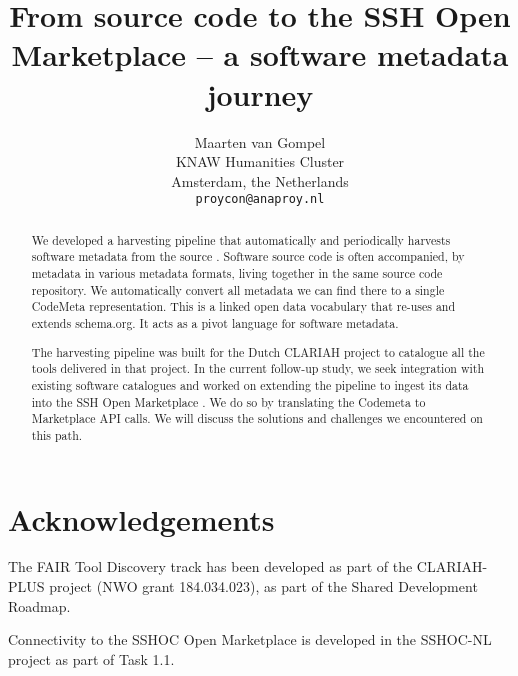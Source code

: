 \documentclass[a4paper,11pt]{article}
\title{From source code to the SSH Open Marketplace -- a software metadata journey}
\author{Maarten van Gompel \\
  KNAW Humanities Cluster \\
  Amsterdam, the Netherlands \\
  {\tt proycon@anaproy.nl} %
}
\date{}
\begin{document}
\maketitle
\begin{abstract}
We developed a harvesting pipeline that automatically and periodically harvests
software metadata from the source \citep{CLARINCONF2024}. Software source code is often accompanied,
by metadata in various metadata formats, living together in the same source
code repository. We automatically convert all metadata we can find there to a
single CodeMeta representation. This is a linked open data vocabulary that
re-uses and extends schema.org. It acts as a pivot language for software
metadata. 

The harvesting pipeline was built for the Dutch CLARIAH project to catalogue all
the tools delivered in that project. In the current follow-up study, we seek
integration with existing software catalogues and worked on extending the
pipeline to ingest its data into the SSH Open Marketplace \citep{MPSPEC,MPINTEROP,MPDATAPOP}. We do so by
translating the Codemeta to Marketplace API calls. We will discuss the
solutions and challenges we encountered on this path. 
\end{abstract}


\section*{Acknowledgements}

The FAIR Tool Discovery track has been developed as part of the CLARIAH-PLUS
project (NWO grant 184.034.023), as part of the Shared Development Roadmap.

Connectivity to the SSHOC Open Marketplace is developed in the 
SSHOC-NL project as part of Task 1.1.

\printbibliography
\end{document}

